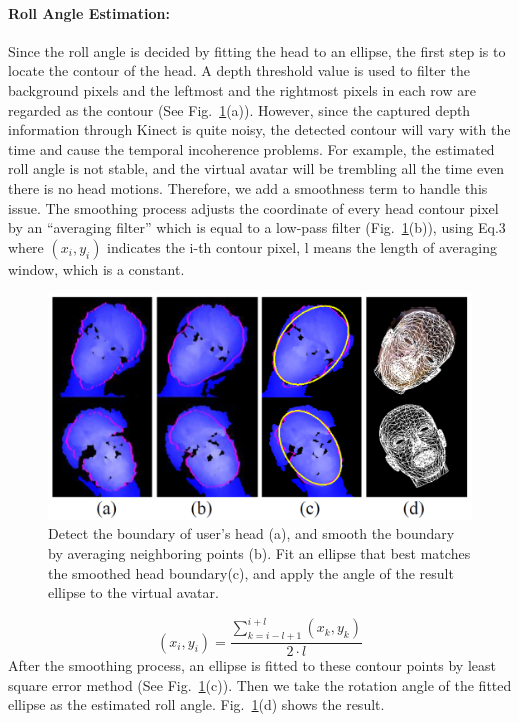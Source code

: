 \paragraph{Roll Angle Estimation:}
Since the roll angle is decided by fitting the head to an ellipse, the first step is to locate the contour of the head. A depth threshold value is used to filter the background pixels and the leftmost and the rightmost pixels in each row are regarded as the contour (See Fig.~\ref{fig:6}(a)). However, since the captured depth information through Kinect is quite noisy, the detected contour will vary with the time and cause the temporal incoherence problems. For example, the estimated roll angle is not stable, and the virtual avatar will be trembling all the time even there is no head motions. Therefore, we add a smoothness term to handle this issue. The smoothing process adjusts the coordinate of every head contour pixel by an “averaging filter” which is equal to a low-pass filter (Fig.~\ref{fig:6}(b)), using Eq.3 where $(x_{i},y_{i})$ indicates the i-th contour pixel, l means the length of averaging window, which is a constant.

\begin{figure}
\includegraphics[width=1.0\linewidth]{./fig6.png}
\caption{Detect the boundary of user’s head (a), and smooth the boundary by averaging neighboring points (b). Fit an ellipse that best matches the smoothed head boundary(c), and apply the angle of the result ellipse to the virtual avatar.}
\label{fig:6}       %
\end{figure}

\begin{equation}
(x_{i},y_{i})=\frac{\sum_{k=i-l+1}^{i+l}{(x_{k},y_{k})}}{2\cdot l}
\end{equation}
After the smoothing process, an ellipse is fitted to these contour points by least square error method (See Fig.~\ref{fig:6}(c)). Then we take the rotation angle of the fitted ellipse as the estimated roll angle. Fig.~\ref{fig:6}(d) shows the result.

